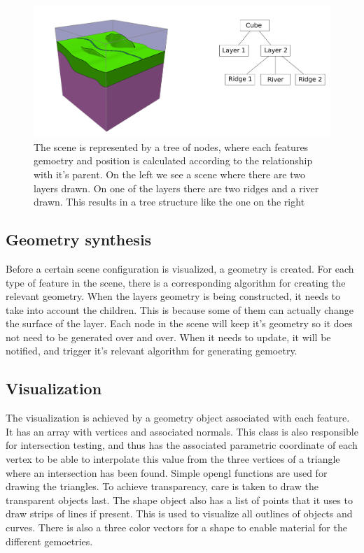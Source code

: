 \documentclass[a4paper,12pt]{report}
\begin{document}
\begin{figure}
 \includegraphics[width=\linewidth]{thesis/tree.pdf}
 \caption{The scene is represented by a tree of nodes, where each features gemoetry and position is calculated according to the relationship with it's parent. On the left we see a scene where there are two layers drawn. On one of the layers there are two ridges and a river drawn. This results in a tree structure like the one on the right}
 \label{fig:tree}
\end{figure}


\subsection{Geometry synthesis}
Before a certain scene configuration is visualized, a geometry is created. For each type of feature in the scene, there is a corresponding algorithm for creating the relevant geometry. When the layers geometry is being constructed, it needs to take into account the children. This is because some of them can actually change the surface of the layer. Each node in the scene will keep it's geometry so it does not need to be generated over and over. When it needs to update, it will be notified, and trigger it's relevant algorithm for generating gemoetry.

\subsection{Visualization}
The visualization is achieved by a geometry object associated with each feature. It has an array with vertices and associated normals. This class is also responsible for intersection testing, and thus has the associated parametric coordinate of each vertex to be able to interpolate this value from the three vertices of a triangle where an intersection has been found. Simple opengl functions are used for drawing the triangles. To achieve transparency, care is taken to draw the transparent objects last. The shape object also has a list of points that it uses to draw strips of lines if present. This is used to visualize all outlines of objects and curves. There is also a three color vectors for a shape to enable material for the different gemoetries.
\end{document}
